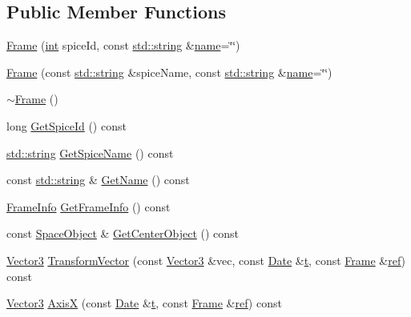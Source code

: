 \subsection*{Public Member Functions}
\begin{DoxyCompactItemize}
\item 
\hyperlink{class_frame_affeadc282e1d1b07d51918add4b48fbf}{Frame} (\hyperlink{wglext_8h_a500a82aecba06f4550f6849b8099ca21}{int} spice\+Id, const \hyperlink{glext_8h_ae84541b4f3d8e1ea24ec0f466a8c568b}{std\+::string} \&\hyperlink{glext_8h_ad977737dfc9a274a62741b9500c49a32}{name}=\char`\"{}\char`\"{})
\item 
\hyperlink{class_frame_a7254d330d38d6d454f5a77777d8f1bcb}{Frame} (const \hyperlink{glext_8h_ae84541b4f3d8e1ea24ec0f466a8c568b}{std\+::string} \&spice\+Name, const \hyperlink{glext_8h_ae84541b4f3d8e1ea24ec0f466a8c568b}{std\+::string} \&\hyperlink{glext_8h_ad977737dfc9a274a62741b9500c49a32}{name}=\char`\"{}\char`\"{})
\item 
\hyperlink{class_frame_abec8c7bccdfc88cb4da137caae9f73d6}{$\sim$\+Frame} ()
\item 
long \hyperlink{class_frame_a679aa287b6474930b7c1682f3a9ceb14}{Get\+Spice\+Id} () const 
\item 
\hyperlink{glext_8h_ae84541b4f3d8e1ea24ec0f466a8c568b}{std\+::string} \hyperlink{class_frame_ad7596949a1ff9c2d1dd837e730f6aefc}{Get\+Spice\+Name} () const 
\item 
const \hyperlink{glext_8h_ae84541b4f3d8e1ea24ec0f466a8c568b}{std\+::string} \& \hyperlink{class_frame_afc3c2fb53313f43fd6b906cd5423145e}{Get\+Name} () const 
\item 
\hyperlink{struct_frame_1_1_frame_info}{Frame\+Info} \hyperlink{class_frame_a676a0342efbbafb23ef5366e02843b15}{Get\+Frame\+Info} () const 
\item 
const \hyperlink{class_space_object}{Space\+Object} \& \hyperlink{class_frame_ad41c119171bcaebc84a9c5e0daea6c92}{Get\+Center\+Object} () const 
\item 
\hyperlink{class_vector3}{Vector3} \hyperlink{class_frame_a9fac9191222fbcf79954b5cb4fe8a181}{Transform\+Vector} (const \hyperlink{class_vector3}{Vector3} \&vec, const \hyperlink{class_date}{Date} \&\hyperlink{glext_8h_a7d65d00ca3b0630d9b5c52df855b19f5}{t}, const \hyperlink{class_frame}{Frame} \&\hyperlink{glext_8h_ad32bdec748ba376f6c0d2df39ab9a95b}{ref}) const 
\item 
\hyperlink{class_vector3}{Vector3} \hyperlink{class_frame_ac8195fe92d18baac95813e2bf751f533}{Axis\+X} (const \hyperlink{class_date}{Date} \&\hyperlink{glext_8h_a7d65d00ca3b0630d9b5c52df855b19f5}{t}, const \hyperlink{class_frame}{Frame} \&\hyperlink{glext_8h_ad32bdec748ba376f6c0d2df39ab9a95b}{ref}) const 

\end{DoxyCompactItemize}
